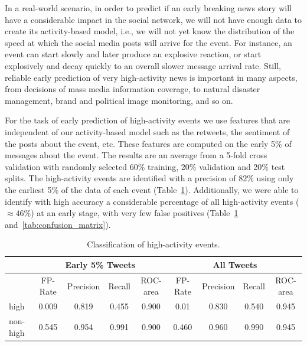 
In a real-world scenario, in order to predict if an early breaking
news story will have a considerable impact in the social network, we
will not have enough data to create its activity-based model, i.e., we
will not yet know the distribution of the speed at which the social
media posts will arrive for the event. For instance, an event can
start slowly and later produce an explosive reaction, or start
explosively and decay quickly to an overall slower message arrival
rate. Still, reliable early prediction of very high-activity news is
important in many aspects, from decisions of mass media information
coverage, to natural disaster management, brand and political image
monitoring, and so on.

For the task of early prediction of high-activity events we use features 
that are independent of our activity-based model such as
the retweets, the sentiment of the posts about the event, etc. 
These features are computed on the early 5\% of messages about the event.
The results are an average from a 5-fold cross validation with
randomly selected 60\% training, 20\% validation and 20\% test splits.
The high-activity events are identified with a precision of 82\% using
only the earliest 5\% of the data of each event
(Table~\ref{tab:classification_results}).  Additionally, we were able to
identify with high accuracy a considerable percentage of all
high-activity events ($\approx 46\%$) at an early stage, with very few
false positives (Table~\ref{tab:classification_results} and~\ref{tab:confusion_matrix}).

\begin{table}[!htb]
  \centering
  {\scriptsize
    \begin{tabularx}{\textwidth}{lcccc|cccc}
      \toprule
      & \multicolumn{4}{c}{\textbf{Early 5\% Tweets}} & \multicolumn{4}{c}{\textbf{All Tweets}} \\
      \midrule
      & FP-Rate & Precision & Recall & ROC-area & FP-Rate & Precision & Recall & ROC-area \\
      high & 0.009 & 0.819 & 0.455 & 0.900 & 0.01 & 0.830 & 0.540 & 0.945 \\
      non-high & 0.545 & 0.954 & 0.991 & 0.900 &  0.460 & 0.960 & 0.990 & 0.945 \\
      \bottomrule
    \end{tabularx}
  }
  \caption[Classification of high-activity events]{{Classification of high-activity events.}}
  \label{tab:classification_results}
\end{table}

